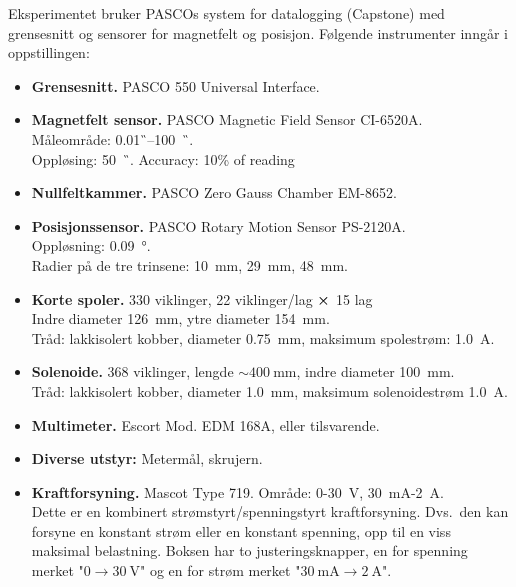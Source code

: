\documentclass[../Elmag-labhefte-2020.tex]{subfiles}
\begin{document}
Eksperimentet bruker PASCOs system for datalogging (Capstone) med grensesnitt og sensorer for magnetfelt og posisjon.
Følgende instrumenter inngår i oppstillingen:
\vspace{-4mm} 
\begin{itemize}
    \item \textbf{Grensesnitt.} PASCO 550 Universal Interface.
    \item \textbf{Magnetfelt sensor.} PASCO Magnetic Field Sensor CI-6520A.\\
    Måleområde: \SI{0,01}{\G}--\SI{100}{\kilo\G}.\\
    Oppløsing: \SI{50}{\milli\G}.
    Accuracy: 10\% of reading
    \item \textbf{Nullfeltkammer.} PASCO Zero Gauss Chamber EM-8652. 
    \item \textbf{Posisjonssensor.} PASCO Rotary Motion Sensor PS-2120A. \\
    Oppløsning: \SI{0,09}{\degree}. \\
    Radier på de tre trinsene: \SI{10}{\mm}, \SI{29}{\mm}, \SI{48}{\mm}.
    \item \textbf{Korte spoler.} 330 viklinger, 22 viklinger/lag $\cross$ 15 lag\\
    Indre diameter \SI{126}{\mm}, ytre diameter \SI{154}{\mm}.\\
    Tråd: lakkisolert kobber, diameter \SI{0,75}{\mm}, maksimum spolestrøm: \SI{1,0}{\ampere}. 
    \item \textbf{Solenoide.} 368 viklinger, lengde $\sim \SI{400}{\mm}$, indre diameter \SI{100}{\mm}.\\
    Tråd: lakkisolert kobber, diameter \SI{1,0}{\mm}, maksimum solenoidestrøm \SI{1,0}{\ampere}. 
    \item \textbf{Multimeter.} Escort Mod. EDM 168A, eller tilsvarende. 
    \item \textbf{Diverse utstyr:} Metermål, skrujern. 
    \item \textbf{Kraftforsyning.} Mascot Type 719. Område: 0-\SI{30}{\volt}, \SI{30}{\milli\ampere}-\SI{2}{\ampere}. \label{magnetfelt.kraftforsyning}
    \\[1mm]
    Dette er en kombinert strømstyrt/spenningstyrt kraftforsyning. Dvs.\ den kan forsyne en konstant strøm eller en konstant spenning, opp til en viss maksimal belastning. Boksen har to justeringsknapper, en for spenning merket "$0 \rightarrow \SI{30}{\volt}$" og en for strøm merket "$\SI{30}{\milli\ampere} \rightarrow \SI{2}{\ampere}$".

\end{itemize}
\end{document}
